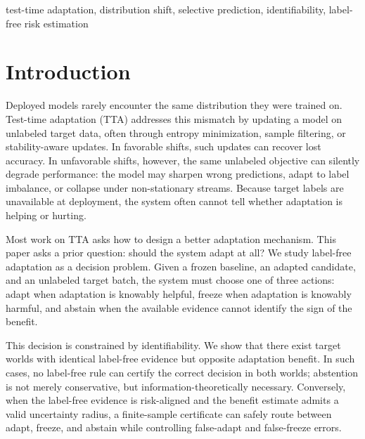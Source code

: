 \documentclass[conference]{IEEEtran}
\theoremstyle{plain}
\theoremstyle{definition}
\begin{document}
\begin{IEEEkeywords}
test-time adaptation, distribution shift, selective prediction, identifiability, label-free risk estimation
\end{IEEEkeywords}

\begin{center}
\end{center}

\section{Introduction}\label{sec:intro}
Deployed models rarely encounter the same distribution they were trained on.
Test-time adaptation (TTA) addresses this mismatch by updating a model on unlabeled
target data, often through entropy minimization, sample filtering, or
stability-aware updates. In favorable shifts, such updates can recover lost
accuracy. In unfavorable shifts, however, the same unlabeled objective can
silently degrade performance: the model may sharpen wrong predictions, adapt to
label imbalance, or collapse under non-stationary streams. Because target labels
are unavailable at deployment, the system often cannot tell whether adaptation is
helping or hurting.

Most work on TTA asks how to design a better adaptation mechanism. This paper asks
a prior question: should the system adapt at all? We study label-free adaptation
as a decision problem. Given a frozen baseline, an adapted candidate, and an
unlabeled target batch, the system must choose one of three actions: adapt when
adaptation is knowably helpful, freeze when adaptation is knowably harmful, and
abstain when the available evidence cannot identify the sign of the benefit.

This decision is constrained by identifiability. We show that there exist target
worlds with identical label-free evidence but opposite adaptation benefit. In such
cases, no label-free rule can certify the correct decision in both worlds;
abstention is not merely conservative, but information-theoretically necessary.
Conversely, when the label-free evidence is risk-aligned and the benefit estimate
admits a valid uncertainty radius, a finite-sample certificate can safely route
between adapt, freeze, and abstain while controlling false-adapt and false-freeze
errors.
\end{document}
